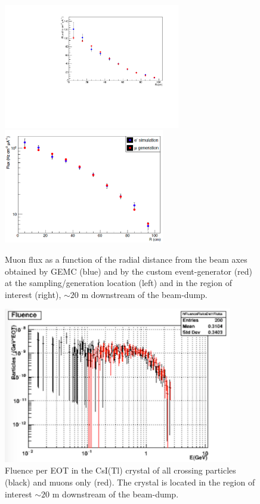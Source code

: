 \begin{figure}[h!] 
\center
\includegraphics[width=7.7cm]{figs/SimVSGen.pdf}
\includegraphics[width=7.0cm]{figs/mu-comp-far.pdf}
\caption{Muon flux as a function of the radial  distance from the beam axes obtained by GEMC (blue) and by the custom event-generator (red) at the sampling/generation location (left) and in the region of interest (right), $\sim 20$ m downstream of the beam-dump.}
\label{fig:mu-sampling-extract} 
\end{figure}


\begin{figure}[h!] 
\center
\includegraphics[width=10cm]{figs/fluence.pdf}   
\caption{Fluence per EOT in the  CsI(Tl) crystal of  all crossing particles (black) and muons only (red). The crystal is located in the region of interest $\sim 20$ m downstream of the beam-dump. }
\label{fig:bg-csi}
\end{figure}


